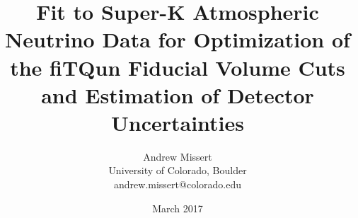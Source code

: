 \documentclass[12pt]{article}
\begin{document}
\title{Fit to Super-K Atmospheric Neutrino Data for Optimization of the fiTQun Fiducial
Volume Cuts and Estimation of Detector Uncertainties}
\author{Andrew Missert\\University of Colorado, Boulder\\andrew.missert@colorado.edu}
\date{March 2017}
\maketitle




\FloatBarrier


\FloatBarrier



\FloatBarrier



\FloatBarrier


%

\FloatBarrier



\FloatBarrier


\appendix






{}




\end{document}
